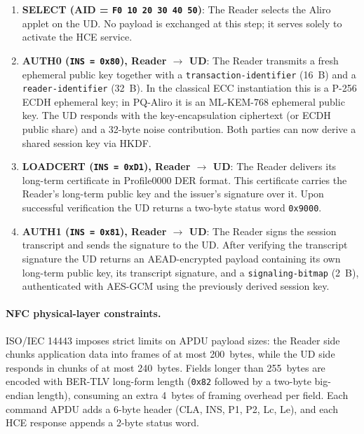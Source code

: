\documentclass[runningheads]{llncs}
\begin{document}
\begin{enumerate}
  \item \textbf{SELECT (AID = \texttt{F0\,10\,20\,30\,40\,50})}: The Reader
        selects the Aliro applet on the UD.  No payload is exchanged at this
        step; it serves solely to activate the HCE service.

  \item \textbf{AUTH0 (\texttt{INS = 0x80}), Reader $\to$ UD}: The Reader
        transmits a fresh ephemeral public key together with a
        \texttt{transaction-identifier} (16~B) and a \texttt{reader-identifier}
        (32~B).  In the classical ECC instantiation this is a P-256 ECDH
        ephemeral key; in PQ-Aliro it is an ML-KEM-768 ephemeral public key.
        The UD responds with the key-encapsulation ciphertext (or ECDH public
        share) and a 32-byte noise contribution.  Both parties can now derive a
        shared session key via HKDF.

  \item \textbf{LOADCERT (\texttt{INS = 0xD1}), Reader $\to$ UD}: The Reader
        delivers its long-term certificate in Profile0000 DER format.  This
        certificate carries the Reader's long-term public key and the issuer's
        signature over it.  Upon successful verification the UD returns a
        two-byte status word \texttt{0x9000}.

  \item \textbf{AUTH1 (\texttt{INS = 0x81}), Reader $\to$ UD}: The Reader
        signs the session transcript and sends the signature to the UD.  After
        verifying the transcript signature the UD returns an AEAD-encrypted
        payload containing its own long-term public key, its transcript
        signature, and a \texttt{signaling-bitmap} (2~B), authenticated with
        AES-GCM using the previously derived session key.
\end{enumerate}

\paragraph{NFC physical-layer constraints.}
ISO/IEC 14443 imposes strict limits on APDU payload sizes: the Reader side
chunks application data into frames of at most 200~bytes, while the UD side
responds in chunks of at most 240~bytes.  Fields longer than 255~bytes are
encoded with BER-TLV long-form length (\texttt{0x82} followed by a two-byte
big-endian length), consuming an extra 4~bytes of framing overhead per field.
Each command APDU adds a 6-byte header (CLA, INS, P1, P2, Lc, Le),
and each HCE response appends a 2-byte status word.
\end{document}
